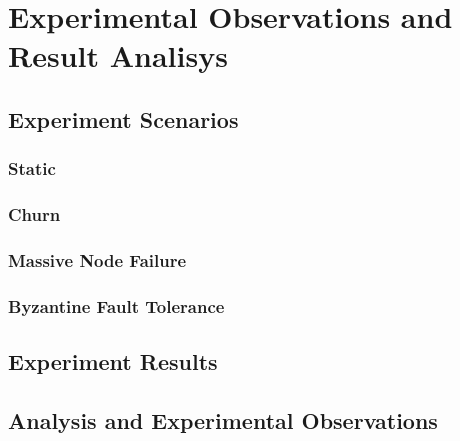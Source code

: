 \chapter{Experimental Observations and Result Analisys} 
\label{chap:results}

\section{Experiment Scenarios}

\subsection{Static}
\subsection{Churn}
\subsection{Massive Node Failure}
\subsection{Byzantine Fault Tolerance}

\section{Experiment Results}
\section{Analysis and Experimental Observations}